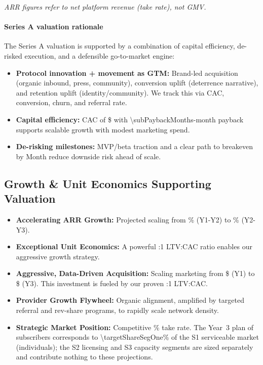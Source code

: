 \par\noindent\textit{ARR figures refer to net platform revenue (take rate), not GMV.}

\paragraph{Series A valuation rationale}
The Series A valuation is supported by a combination of capital efficiency, de-risked execution, and a defensible go-to-market engine:
\begin{itemize}
    \item \textbf{Protocol innovation + movement as GTM:} Brand-led acquisition (organic inbound, press, community), conversion uplift (deterrence narrative), and retention uplift (identity/community). We track this via CAC, conversion, churn, and referral rate.
    \item \textbf{Capital efficiency:} CAC of \$\numint{\cacDigital} with \num{\subPaybackMonths}-month payback supports scalable growth with modest marketing spend.
    \item \textbf{De-risking milestones:} MVP/beta traction and a clear path to breakeven by Month \numint{\breakevenMonth} reduce downside risk ahead of scale.
\end{itemize}

\subsection{Growth \& Unit Economics Supporting Valuation}
\begin{itemize}
    \item \textbf{Accelerating ARR Growth:} Projected scaling from \numint{\growthRateYearOneTwo}\% (Y1-Y2) to \numint{\growthRateYearTwoThree}\% (Y2-Y3).
    
    \item \textbf{Exceptional Unit Economics:} A powerful \numint{\ltvCacRatio}:1 LTV:CAC ratio enables our aggressive growth strategy.
    
    \item \textbf{Aggressive, Data-Driven Acquisition:} Scaling marketing from \$\numint{\marketingBudgetYearOne} (Y1) to \$\numint{\marketingBudgetYearThree} (Y3). This investment is fueled by our proven \numint{\ltvCacRatio}:1 LTV:CAC.
    
    \item \textbf{Provider Growth Flywheel:} Organic alignment, amplified by targeted referral and rev-share programs, to rapidly scale network density.
    
    \item \textbf{Strategic Market Position:} Competitive \markPlatformFeePercent\% take rate. The Year~3 plan of \numint{\totalSubsYearThree} subscribers corresponds to \num[round-precision=1]{\targetShareSegOne}\% of the S1 serviceable market (individuals); the S2 licensing and S3 capacity segments are sized separately and contribute nothing to these projections.
\end{itemize}

